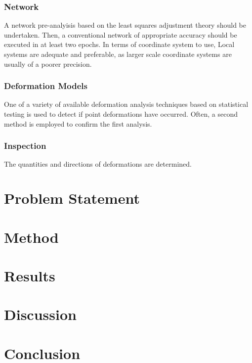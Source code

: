 \documentclass{article}
\begin{document}
\subsubsection{Network}
A network pre-analyisis based on the least squares adjustment theory should be
undertaken. Then, a conventional network of appropriate accuracy should be
executed in at least two epochs. In terms of coordinate system to use, Local
systems are adequate and preferable, as larger scale coordinate systems are
usually of a poorer precision.

\subsubsection{Deformation Models}
One of a variety of available deformation analysis techniques based on statistical
testing is used to detect if point deformations have occurred. Often, a second
method is employed to confirm the first analysis.

\subsubsection{Inspection}
The quantities and directions of deformations are determined.


\section{Problem Statement}

\section{Method}

\section{Results}

\section{Discussion}

\section{Conclusion}
\end{document}
